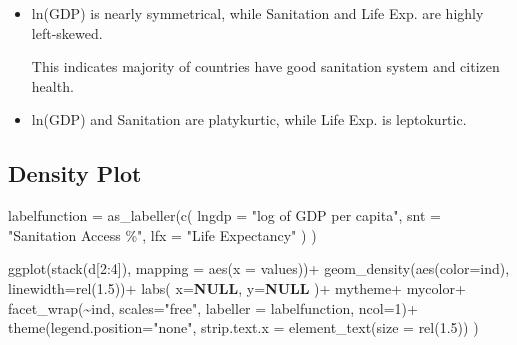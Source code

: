 \documentclass[
]{article}
\newenvironment{Shaded}{}{}
\newcommand{\AttributeTok}[1]{\textcolor[rgb]{0.84,0.60,0.13}{#1}}
\newcommand{\ConstantTok}[1]{\textcolor[rgb]{0.69,0.38,0.53}{\textbf{#1}}}
\newcommand{\DecValTok}[1]{\textcolor[rgb]{0.96,0.45,0.00}{#1}}
\newcommand{\FloatTok}[1]{\textcolor[rgb]{0.96,0.45,0.00}{#1}}
\newcommand{\FunctionTok}[1]{\textcolor[rgb]{0.41,0.62,0.42}{#1}}
\newcommand{\NormalTok}[1]{\textcolor[rgb]{0.24,0.22,0.21}{#1}}
\newcommand{\OtherTok}[1]{\textcolor[rgb]{0.41,0.62,0.42}{#1}}
\newcommand{\SpecialCharTok}[1]{\textcolor[rgb]{0.69,0.38,0.53}{#1}}
\newcommand{\StringTok}[1]{\textcolor[rgb]{0.60,0.59,0.10}{#1}}
\begin{document}
\begin{itemize}
\item
  ln(GDP) is nearly symmetrical, while Sanitation and Life Exp. are
  highly left-skewed.

  This indicates majority of countries have good sanitation system and
  citizen health.
\item
  ln(GDP) and Sanitation are platykurtic, while Life Exp. is
  leptokurtic.
\end{itemize}

\hypertarget{density-plot}{%
\subsection{Density Plot}\label{density-plot}}

\begin{Shaded}
\begin{Highlighting}[]
\NormalTok{labelfunction }\OtherTok{=} \FunctionTok{as\_labeller}\NormalTok{(}\FunctionTok{c}\NormalTok{(}
    \StringTok{\textasciigrave{}}\AttributeTok{lngdp}\StringTok{\textasciigrave{}} \OtherTok{=} \StringTok{"log of GDP per capita"}\NormalTok{,}
    \StringTok{\textasciigrave{}}\AttributeTok{snt}\StringTok{\textasciigrave{}} \OtherTok{=} \StringTok{"Sanitation Access \%"}\NormalTok{,}
    \StringTok{\textasciigrave{}}\AttributeTok{lfx}\StringTok{\textasciigrave{}} \OtherTok{=} \StringTok{"Life Expectancy"}
\NormalTok{    )}
\NormalTok{)}

\FunctionTok{ggplot}\NormalTok{(}\FunctionTok{stack}\NormalTok{(d[}\DecValTok{2}\SpecialCharTok{:}\DecValTok{4}\NormalTok{]), }\AttributeTok{mapping =} \FunctionTok{aes}\NormalTok{(}\AttributeTok{x =}\NormalTok{ values))}\SpecialCharTok{+}
\FunctionTok{geom\_density}\NormalTok{(}\FunctionTok{aes}\NormalTok{(}\AttributeTok{color=}\NormalTok{ind), }\AttributeTok{linewidth=}\FunctionTok{rel}\NormalTok{(}\FloatTok{1.5}\NormalTok{))}\SpecialCharTok{+}
\FunctionTok{labs}\NormalTok{(}
  \AttributeTok{x=}\ConstantTok{NULL}\NormalTok{,}
  \AttributeTok{y=}\ConstantTok{NULL}
\NormalTok{  )}\SpecialCharTok{+}
\NormalTok{mytheme}\SpecialCharTok{+}
\NormalTok{mycolor}\SpecialCharTok{+}
\FunctionTok{facet\_wrap}\NormalTok{(}\SpecialCharTok{\textasciitilde{}}\NormalTok{ind, }\AttributeTok{scales=}\StringTok{"free"}\NormalTok{, }\AttributeTok{labeller =}\NormalTok{ labelfunction, }\AttributeTok{ncol=}\DecValTok{1}\NormalTok{)}\SpecialCharTok{+}
  \FunctionTok{theme}\NormalTok{(}\AttributeTok{legend.position=}\StringTok{"none"}\NormalTok{,}
        \AttributeTok{strip.text.x =} \FunctionTok{element\_text}\NormalTok{(}\AttributeTok{size =} \FunctionTok{rel}\NormalTok{(}\FloatTok{1.5}\NormalTok{))}
\NormalTok{  )}
\end{Highlighting}
\end{Shaded}
\end{document}
